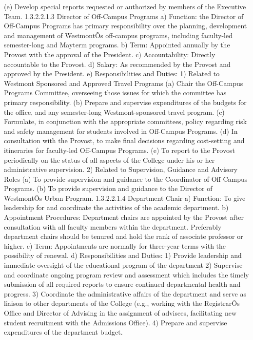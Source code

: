 \documentclass[letterpaper, 11pt]{article}
\begin{document}
(e) Develop special reports requested or authorized by members of the Executive Team.
1.3.2.2.1.3 	Director of Off-Campus Programs
a) Function:  the Director of Off-Campus Programs has primary responsibility over the planning, development and management of WestmontÕs off-campus programs, including faculty-led semester-long and Mayterm programs.
b) Term:  Appointed annually by the Provost with the approval of the President.
c) Accountability:  Directly accountable to the Provost.
d) Salary:  As recommended by the Provost and approved by the President.
e) Responsibilities and Duties:
1) Related to Westmont Sponsored and Approved Travel Programs
(a) Chair the Off-Campus Programs Committee, overseeing those issues for which the committee has primary responsibility.
(b) Prepare and supervise expenditures of the budgets for the office, and any semester-long Westmont-sponsored travel program.
(c) Formulate, in conjunction with the appropriate committees, policy regarding risk and safety management for students involved in Off-Campus Programs.
(d) In consultation with the Provost, to make final decisions regarding cost-setting and itineraries for faculty-led Off-Campus Programs.
(e) To report to the Provost periodically on the status of all aspects of the College under his or her administrative supervision.
2) Related to Supervision, Guidance and Advisory Roles
(a) To provide supervision and guidance to the Coordinator of Off-Campus Programs.
(b) To provide supervision and guidance to the Director of WestmontÕs Urban Program.
1.3.2.2.1.4 Department Chair
a) Function:  To give leadership for and coordinate the activities of the academic department.
b) Appointment Procedures:  Department chairs are appointed by the Provost after consultation with all faculty members within the department.  Preferably department chairs should be tenured and hold the rank of associate professor or higher.
c) Term:  Appointments are normally for three-year terms with the possibility of renewal.
d) Responsibilities and Duties:
1) Provide leadership and immediate oversight of the educational program of the department
2) Supervise and coordinate ongoing program review and assessment which includes the timely submission of all required reports to ensure continued departmental health and progress.
3) Coordinate the administrative affairs of the department and serve as liaison to other departments of the College (e.g., working with the RegistrarÕs Office and Director of Advising in the assignment of advisees, facilitating new student recruitment with the Admissions Office).
4) Prepare and supervise expenditures of the department budget.
\end{document}
